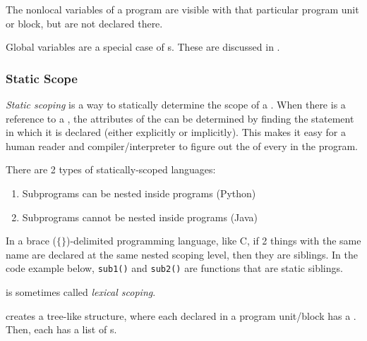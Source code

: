 \begin{definition}\label{def:Nonlocal_Variable}
  The nonlocal variables of a program are visible with that particular program unit or block, but are not declared there.

  \begin{remark}
    Global variables are a special case of s.
    These are discussed in .
  \end{remark}
\end{definition}

\subsubsection{Static Scope}\label{subsubsec:Static_Scope}
\begin{definition}\label{def:Static_Scoping}
  \emph{Static scoping} is a way to statically determine the scope of a .
  When there is a reference to a , the attributes of the  can be determined by finding the statement in which it is declared (either explicitly or implicitly).
  This makes it easy for a human reader and compiler/interpreter to figure out the  of every  in the program.

  There are 2 types of statically-scoped languages:
  \begin{enumerate}[noitemsep]
  \item Subprograms can be nested inside programs (Python)
  \item Subprograms cannot be nested inside programs (Java)
  \end{enumerate}

  In a brace ($\lbrace \rbrace$)-delimited programming language, like C, if 2 things with the same name are declared at the same nested scoping level, then they are siblings.
  In the code example below, \texttt{sub1()} and \texttt{sub2()} are functions that are static siblings.

  \begin{remark}\label{rmk:Variable_Lexical_Scoping}
     is sometimes called \emph{lexical scoping}.
  \end{remark}
\end{definition}

 creates a tree-like structure, where each  declared in a program unit/block has a .
Then, each  has a list of s.

